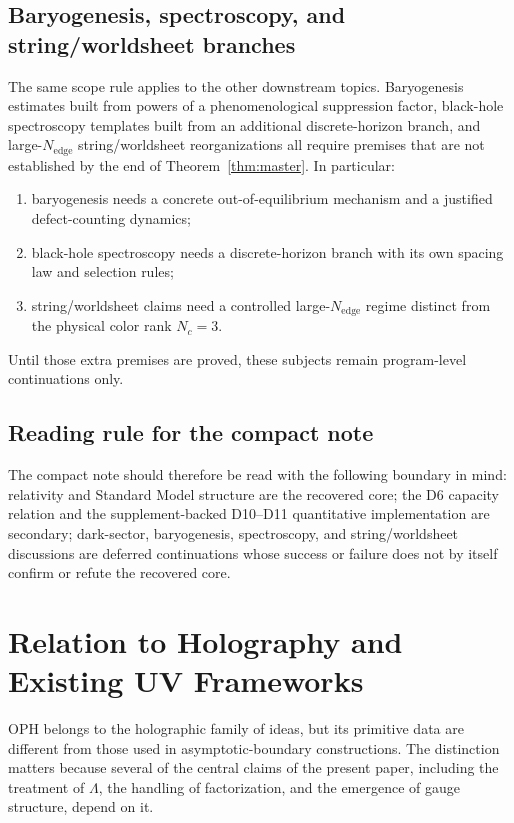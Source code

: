 \documentclass[11pt]{article}
\begin{document}
\subsection{Baryogenesis, spectroscopy, and string/worldsheet branches}

The same scope rule applies to the other downstream topics. Baryogenesis estimates built from powers of a phenomenological suppression factor, black-hole spectroscopy templates built from an additional discrete-horizon branch, and large-$N_{\mathrm{edge}}$ string/worldsheet reorganizations all require premises that are not established by the end of Theorem~\ref{thm:master}. In particular:
\begin{enumerate}[leftmargin=2em]
\item baryogenesis needs a concrete out-of-equilibrium mechanism and a justified defect-counting dynamics;
\item black-hole spectroscopy needs a discrete-horizon branch with its own spacing law and selection rules;
\item string/worldsheet claims need a controlled large-$N_{\mathrm{edge}}$ regime distinct from the physical color rank $N_c=3$.
\end{enumerate}
Until those extra premises are proved, these subjects remain program-level continuations only.

\subsection{Reading rule for the compact note}

The compact note should therefore be read with the following boundary in mind: relativity and Standard Model structure are the recovered core; the D6 capacity relation and the supplement-backed D10--D11 quantitative implementation are secondary; dark-sector, baryogenesis, spectroscopy, and string/worldsheet discussions are deferred continuations whose success or failure does not by itself confirm or refute the recovered core.

\section{Relation to Holography and Existing UV Frameworks}

OPH belongs to the holographic family of ideas, but its primitive data are different from those used in asymptotic-boundary constructions. The distinction matters because several of the central claims of the present paper, including the treatment of $\Lambda$, the handling of factorization, and the emergence of gauge structure, depend on it.
\end{document}
